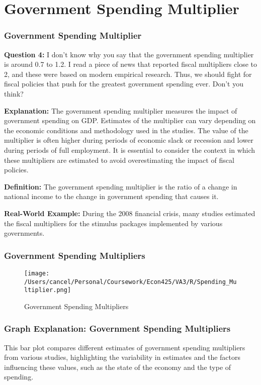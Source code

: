 \documentclass{beamer}
\begin{document}
\section{Government Spending Multiplier}
\begin{frame}
    \frametitle{Government Spending Multiplier}
    \textbf{Question 4:} I don’t know why you say that the government spending multiplier is around 0.7 to 1.2. I read a piece of news that reported fiscal multipliers close to 2, and these were based on modern empirical research. Thus, we should fight for fiscal policies that push for the greatest government spending ever. Don’t you think?

    \textbf{Explanation:} The government spending multiplier measures the impact of government spending on GDP. Estimates of the multiplier can vary depending on the economic conditions and methodology used in the studies. The value of the multiplier is often higher during periods of economic slack or recession and lower during periods of full employment. It is essential to consider the context in which these multipliers are estimated to avoid overestimating the impact of fiscal policies.

    \textbf{Definition:} The government spending multiplier is the ratio of a change in national income to the change in government spending that causes it.

    \textbf{Real-World Example:} During the 2008 financial crisis, many studies estimated the fiscal multipliers for the stimulus packages implemented by various governments.
\end{frame}

\begin{frame}
    \frametitle{Government Spending Multipliers}
    \begin{figure}[h!]
        \centering
        \texttt{[image: /Users/cancel/Personal/Coursework/Econ425/VA3/R/Spending\_Multiplier.png]}
        \caption{Government Spending Multipliers}
    \end{figure}
\end{frame}

\begin{frame}
    \frametitle{Graph Explanation: Government Spending Multipliers}
    This bar plot compares different estimates of government spending multipliers from various studies, highlighting the variability in estimates and the factors influencing these values, such as the state of the economy and the type of spending.
\end{frame}
\end{document}
